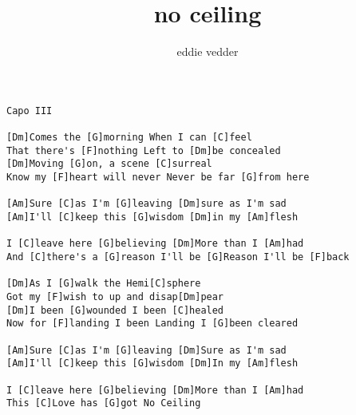 \author{eddie vedder}
\title{no ceiling}
\maketitle
\begin{verbatim}
Capo III

[Dm]Comes the [G]morning When I can [C]feel
That there's [F]nothing Left to [Dm]be concealed
[Dm]Moving [G]on, a scene [C]surreal
Know my [F]heart will never Never be far [G]from here

[Am]Sure [C]as I'm [G]leaving [Dm]sure as I'm sad
[Am]I'll [C]keep this [G]wisdom [Dm]in my [Am]flesh

I [C]leave here [G]believing [Dm]More than I [Am]had
And [C]there's a [G]reason I'll be [G]Reason I'll be [F]back

[Dm]As I [G]walk the Hemi[C]sphere
Got my [F]wish to up and disap[Dm]pear
[Dm]I been [G]wounded I been [C]healed
Now for [F]landing I been Landing I [G]been cleared

[Am]Sure [C]as I'm [G]leaving [Dm]Sure as I'm sad
[Am]I'll [C]keep this [G]wisdom [Dm]In my [Am]flesh

I [C]leave here [G]believing [Dm]More than I [Am]had
This [C]Love has [G]got No Ceiling
\end{verbatim}